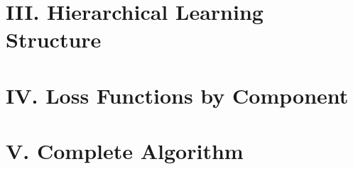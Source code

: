 \documentclass[11pt,twoside]{book}
\begin{document}
\section*{III. Hierarchical Learning Structure}

\section*{IV. Loss Functions by Component}

\section*{V. Complete Algorithm}

\end{document}
